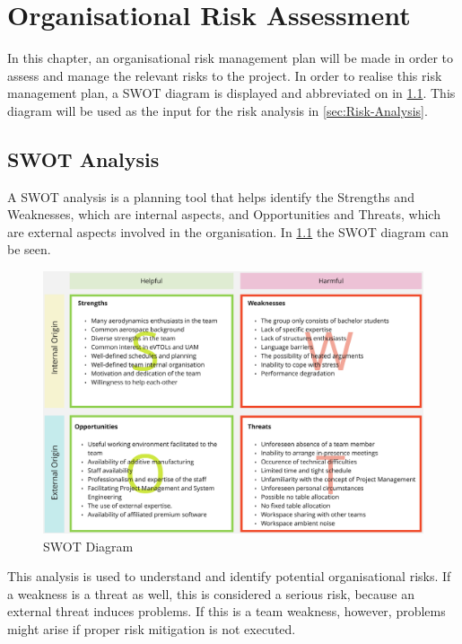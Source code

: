 \chapter{Organisational Risk Assessment}\label{ch:organisational-risk-assessment}
In this chapter, an organisational risk management plan will be made in order to assess and manage the relevant risks to the project.
In order to realise this risk management plan, a SWOT diagram is displayed and abbreviated on in \cref{sec:SWOT-Analysis}.
This diagram will be used as the input for the risk analysis in \cref{sec:Risk-Analysis}.


\section{SWOT Analysis}\label{sec:SWOT-Analysis}
A SWOT analysis is a planning tool that helps identify the Strengths and Weaknesses, which are internal aspects, and Opportunities and Threats, which are external aspects involved in the organisation.
In \cref{fig:swotanalysis} the SWOT diagram can be seen.
\begin{figure}[ht]
    \centering
    \includegraphics[width=\linewidth]{figures/Copy SWOT Analysis.jpg}
    \caption{SWOT Diagram}
    \label{fig:swotanalysis}
\end{figure}

This analysis is used to understand and identify potential organisational risks.
If a weakness is a threat as well, this is considered a serious risk, because an external threat induces problems.
If this is a team weakness, however, problems might arise if proper risk mitigation is not executed.


